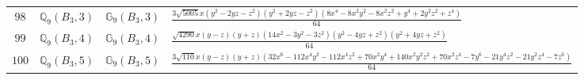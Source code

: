 \documentclass[fleqn,8pt,landscape]{jsarticle}
\begin{document}
\begin{table}[ht!]
\begin{center}
\begin{tabular}{cccl}
$ 98 $ & $ \mathbb{Q}_{9}(B_{3},3) $ & $ \mathbb{G}_{9}(B_{3},3) $ & $ \frac{3 \sqrt{5005} x \left(y^{2} - 2 y z - z^{2}\right) \left(y^{2} + 2 y z - z^{2}\right) \left(8 x^{4} - 8 x^{2} y^{2} - 8 x^{2} z^{2} + y^{4} + 2 y^{2} z^{2} + z^{4}\right)}{64} $ \\
$ 99 $ & $ \mathbb{Q}_{9}(B_{3},4) $ & $ \mathbb{G}_{9}(B_{3},4) $ & $ \frac{\sqrt{4290} x \left(y - z\right) \left(y + z\right) \left(14 x^{2} - 3 y^{2} - 3 z^{2}\right) \left(y^{2} - 4 y z + z^{2}\right) \left(y^{2} + 4 y z + z^{2}\right)}{64} $ \\
$ 100 $ & $ \mathbb{Q}_{9}(B_{3},5) $ & $ \mathbb{G}_{9}(B_{3},5) $ & $ \frac{3 \sqrt{110} x \left(y - z\right) \left(y + z\right) \left(32 x^{6} - 112 x^{4} y^{2} - 112 x^{4} z^{2} + 70 x^{2} y^{4} + 140 x^{2} y^{2} z^{2} + 70 x^{2} z^{4} - 7 y^{6} - 21 y^{4} z^{2} - 21 y^{2} z^{4} - 7 z^{6}\right)}{64} $ \\
 \hline \hline
\end{tabular}
\end{center}
\end{table}
\end{document}
